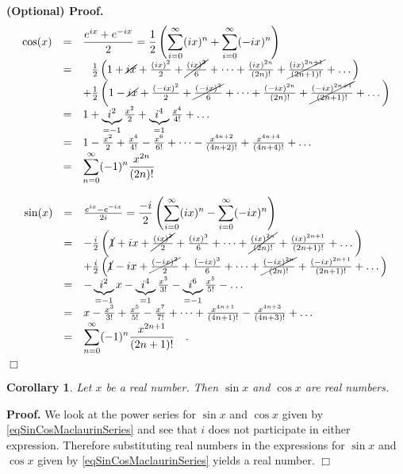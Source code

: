 \documentclass[12pt]{book}
\newenvironment{proof}[1][]{ \textbf{Proof#1.} }{$\Box$\medskip}
\newenvironment{proofOptional}[1][]{ \noindent \textbf{(Optional) Proof#1.}}{$\Box$\medskip}
\newtheorem{corollary}[theorem]{Corollary}
\begin{document}
\begin{proofOptional}
\[
\begin{array}{rcl}
\displaystyle\cos(x)&=& \displaystyle \frac{e^{ix}+e^{-ix}}{2}= \frac 12 \left(\sum_{i=0}^\infty (ix)^{n}+ \sum_{i=0}^\infty (-ix)^{n}\right)\\
&=& \phantom{+} \frac12\left( 1+ \cancel{ix} + \frac{(ix)^2}2 +\cancel{\frac{(ix)^3}6}+\dots + \frac{(ix)^{2n}}{(2n)!}+ \cancel{\frac{(ix)^{2n+1}}{(2n+1)!}} +\dots \right)
\\
&&+  \frac12\left( 1-\cancel{ix} + \frac{(-ix)^2}2 +\cancel{\frac{(-ix)^3}6}+\dots + \frac{(-ix)^{2n}}{(2n)!}+ \cancel{\frac{(-ix)^{2n+1}}{(2n+1)!}}+\dots \right)\\
&=& 1+\underbrace{i^2}_{=-1}\frac{x^{2}}2+\underbrace{i^4}_{=1}\frac{x^{4}}{4!}+\dots\\
&=&1-\frac{x^2}{2}+\frac{x^4}{4!}-\frac{x^6}{6!}+\dots -\frac{x^{4n+2}}{(4n+2)!}+ \frac{x^{4n+4}}{(4n+4)!}+\dots\\
&=&\displaystyle \sum_{n=0}^\infty (-1)^n\frac{x^{2n}}{(2n)!}
\end{array}
\]


\[
\begin{array}{rcl}
\displaystyle\sin(x)&=& \frac{e^{ix}-e^{-ix}}{2i}=\displaystyle \frac {-i}{2} \left(\sum_{i=0}^\infty (ix)^{n}- \sum_{i=0}^\infty (-ix)^{n}\right)\\
&=&-\frac{i}{2}\left(\cancel{1} + ix + \cancel{\frac{(ix)^2}2} +{\frac{(ix)^3}6}+\dots + \cancel{\frac{(ix)^{2n}}{(2n)!}}+ {\frac{(ix)^{2n+1}}{(2n+1)!}} +\dots \right)\\
&&+  \frac{i}{2}\left(\cancel{1} -{ix} + \cancel{\frac{(-ix)^2}2} +{\frac{(-ix)^3}6}+\dots + \cancel{\frac{(-ix)^{2n}}{(2n)!}}+ {\frac{(-ix)^{2n+1}}{(2n+1)!}}+\dots \right)\\
&=&- \underbrace{i^2}_{=-1}x-\underbrace{i^4}_{=1}\frac{x^3}{3!}-\underbrace{i^{6}}_{=-1}\frac{x^5}{5!} -\dots\\
&=&x-\frac{x^3}{3!}+\frac{x^5}{5!}-\frac{x^7}{7!}+\dots +\frac{x^{4n+1}}{(4n+1)!}- \frac{x^{4n+3}}{(4n+3)!}+\dots\\
&=&\displaystyle \sum_{n=0}^{\infty}(-1)^n\frac{x^{2n+1}}{(2n+1)!}\quad .
\end{array}
\]
\end{proofOptional}
\begin{corollary}\label{corSinCosOfRealIsReal}
Let $x $ be a real number. Then $\sin x$ and $\cos x$ are real numbers.
\end{corollary}
\begin{proof}
We look at the power series for $\sin x$ and $\cos x$ given by \eqref{eqSinCosMaclaurinSeries} and see that $i$ does not participate in either expression. Therefore substituting real numbers in the expressions for $\sin x$ and $\cos x$ given by \eqref{eqSinCosMaclaurinSeries} yields a real number.
\end{proof}
\end{document}
